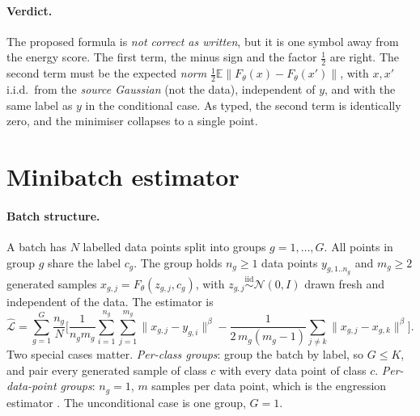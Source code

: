 \documentclass[11pt]{article}
\theoremstyle{definition}
\theoremstyle{remark}
\newcommand{\E}{\mathbb{E}}
\newcommand{\N}{\mathcal{N}}
\newcommand{\norm}[1]{\lVert #1\rVert}
\begin{document}
\paragraph{Verdict.} The proposed formula is \emph{not correct as written}, but it is one symbol away
from the energy score. The first term, the minus sign and the factor $\tfrac12$ are right. The second term
must be the expected \emph{norm} $\tfrac12\E\norm{F_\theta(x)-F_\theta(x')}$, with $x,x'$ i.i.d.\ from the
\emph{source Gaussian} (not the data), independent of $y$, and with the same label as $y$ in the conditional
case. As typed, the second term is identically zero, and the minimiser collapses to a single point.

\section{Minibatch estimator}\label{sec:estimator}
\paragraph{Batch structure.} A batch has $N$ labelled data points split into groups $g=1,\dots,G$. All
points in group $g$ share the label $c_g$. The group holds $n_g\ge1$ data points $y_{g,1..n_g}$ and
$m_g\ge2$ generated samples $x_{g,j}=F_\theta(z_{g,j},c_g)$, with $z_{g,j}\overset{\text{iid}}{\sim}\N(0,I)$
drawn fresh and independent of the data. The estimator is
\begin{equation}\label{eq:estimator}
\widehat{\mathcal L}=\sum_{g=1}^{G}\frac{n_g}{N}\Bigg[\frac{1}{n_gm_g}\sum_{i=1}^{n_g}\sum_{j=1}^{m_g}\norm{x_{g,j}-y_{g,i}}^\beta
-\frac{1}{2\,m_g(m_g-1)}\sum_{j\neq k}\norm{x_{g,j}-x_{g,k}}^\beta\Bigg].
\end{equation}
Two special cases matter. \emph{Per-class groups}: group the batch by label, so $G\le K$, and pair every
generated sample of class $c$ with every data point of class $c$. \emph{Per-data-point groups}: $n_g=1$, $m$
samples per data point, which is the engression estimator \cite[eq.~(13)]{SM2025}. The unconditional case is
one group, $G=1$.
\end{document}
